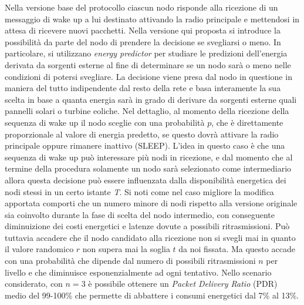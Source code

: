 \documentclass{report}
\begin{document}
Nella versione base del protocollo ciascun nodo risponde alla ricezione di un messaggio di wake up a lui destinato attivando la radio principale e mettendosi
in attesa di ricevere nuovi pacchetti. Nella versione qui proposta si introduce la possibilità da parte del nodo di prendere la decisione se svegliarsi o meno.
In particolare, si utilizzano \emph{energy predictor} per studiare le predizioni dell'energia derivata da sorgenti esterne al fine di determinare se un nodo sarà o
meno nelle condizioni di potersi svegliare. La decisione viene presa dal nodo in questione in maniera del tutto indipendente dal resto della rete e basa interamente
la sua scelta in base a quanta energia sarà in grado di derivare da sorgenti esterne quali pannelli solari o turbine eoliche. Nel dettaglio, al momento
della ricezione della sequenza di wake up il nodo sceglie con una probabilità $p$, che è direttamente proporzionale al valore di energia predetto,
se questo dovrà attivare la radio principale oppure rimanere inattivo (SLEEP). L'idea in questo caso è che una sequenza di wake up può interessare più nodi
in ricezione, e dal momento che al termine della procedura solamente un nodo sarà selezionato come intermediario allora questa decisione può essere influenzata dalla
disponibilità energetica dei nodi stessi in un certo istante \emph{T}. Si noti come nel caso migliore la modifica apportata comporti che un numero minore di nodi
rispetto alla versione originale sia coinvolto durante la fase di scelta del nodo intermedio, con conseguente diminuizione dei costi energetici e latenze dovute a
possibili ritrasmissioni. Può tuttavia accadere che il nodo candidato alla ricezione non si svegli mai in quanto il valore randomico $r$ non supera mai la
soglia $t$ da noi fissata. Ma questo accade con una probabilità che dipende dal numero di possibili ritrasmissioni $n$ per livello e che diminuisce esponenzialmente
ad ogni tentativo. Nello scenario considerato, con $n=3$ è possibile ottenere un \emph{Packet Delivery Ratio} (PDR) medio del 99-100\% che permette di abbattere i
consumi energetici dal 7\% al 13\%.\\
\end{document}
